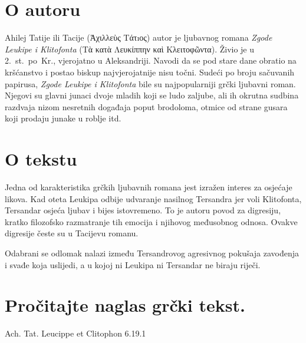 \section*{O autoru}

Ahilej Tatije ili Tacije \textgreek[variant=ancient]{(Ἀχιλλεὺς Τάτıος)} autor je ljubavnog romana \textit{Zgode Leukipe i Klitofonta} \textgreek[variant=ancient]{(Tὰ κατὰ Λευκίππην καὶ Κλειτοφῶντα).} Živio je u 2.~st.\ po~Kr., vjerojatno u Aleksandriji. Navodi da se pod stare dane obratio na kršćanstvo i postao biskup najvjerojatnije nisu točni. Sudeći po broju sačuvanih papirusa, \textit{Zgode Leukipe i Klitofonta} bile su najpopularniji grčki ljubavni roman. Njegovi su glavni junaci dvoje mladih koji se ludo zaljube, ali ih okrutna sudbina razdvaja nizom nesretnih događaja poput brodoloma, otmice od strane gusara koji prodaju junake u roblje itd.

\section*{O tekstu}

Jedna od karakteristika grčkih ljubavnih romana jest izražen interes za osjećaje likova. Kad oteta Leukipa odbije udvaranje nasilnog Tersandra jer voli Klitofonta, Tersandar osjeća ljubav i bijes istovremeno. To je autoru povod za digresiju, kratko filozofsko razmatranje tih emocija i njihovog međusobnog odnosa. Ovakve digresije česte su u Tacijevu romanu. 

Odabrani se odlomak nalazi između Tersandrovog agresivnog pokušaja zavođenja i svađe koja uslijedi, a u kojoj ni Leukipa ni Tersandar ne biraju riječi.

\newpage

\section*{Pročitajte naglas grčki tekst.}

Ach. Tat. Leucippe et Clitophon 6.19.1


\medskip


